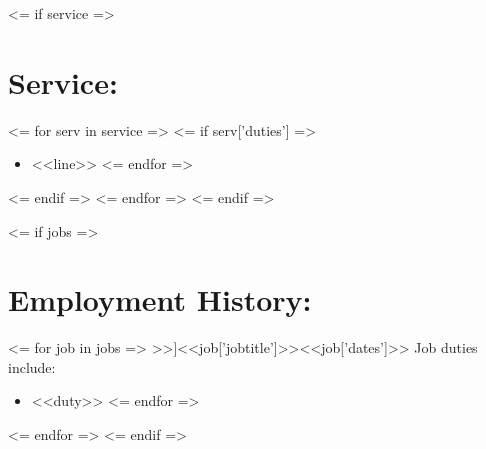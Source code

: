 \documentclass{resume}
\begin{document}
<= if service =>
    \section{Service:}
    <= for serv in service =>
        <= if serv['duties'] =>
            \small\begin{itemize}
            <= for line in serv['duties'] =>
                \item <<line>>
            <= endfor =>
            \end{itemize}\normalsize
        <= endif =>
    <= endfor =>
<= endif =>

<= if jobs =>
    \section{Employment History:}
    <= for job in jobs =>
        \affiliation[<<job['employername']>>]{<<job['jobtitle']>>}{<<job['dates']>>}\normalsize
        Job duties include:
        \small\begin{itemize}
        <= for duty in job['duties'] =>
            \item <<duty>>
        <= endfor =>
        \end{itemize}\normalsize
        \medskip
    <= endfor =>
<= endif =>
\end{document}
